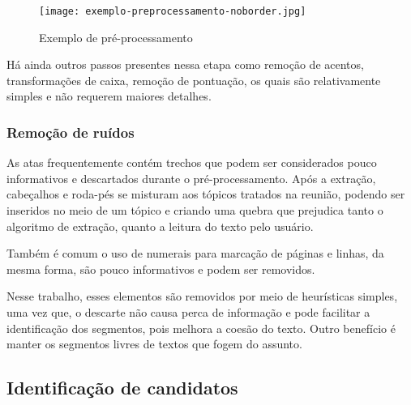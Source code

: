  \begin{figure}[!h]
	\centering
	\texttt{[image: exemplo-preprocessamento-noborder.jpg]}
	\caption{Exemplo de pré-processamento}
	\label{fig:exemplopreprocessamento}
  \end{figure}


Há ainda outros passos presentes nessa etapa como remoção de acentos, transformações de caixa, remoção de pontuação, os quais são relativamente simples e não requerem maiores detalhes.





\subsubsection{Remoção de ruídos}

As atas frequentemente contém trechos que podem ser considerados pouco informativos e descartados durante o pré-processamento. 
Após a extração, cabeçalhos e roda-pés se misturam aos tópicos tratados na reunião, podendo ser  inseridos no meio de um tópico e criando uma quebra que prejudica tanto o algoritmo de extração, quanto a leitura do texto pelo usuário.

Também é comum o uso de numerais para marcação de páginas e linhas, da mesma forma, são pouco informativos e podem ser removidos.

Nesse trabalho, esses elementos são removidos por meio de heurísticas simples, uma vez que, o descarte não causa perca de informação e pode facilitar a identificação dos segmentos, pois melhora a coesão do texto. Outro benefício é manter os segmentos livres de textos que fogem do assunto.



		





	

\subsection{Identificação de candidatos}
	\label{subsec:indentificacaosentencas}
	
